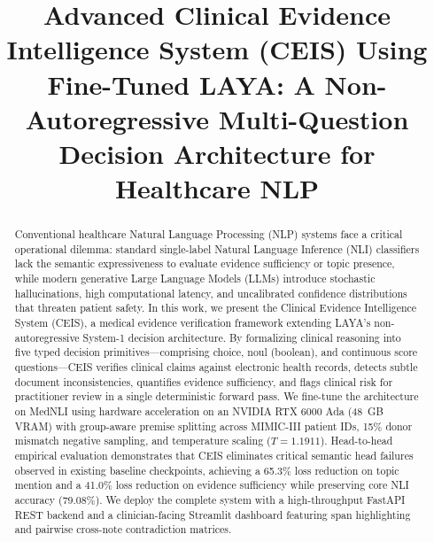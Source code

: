 \documentclass[10pt,conference]{IEEEtran}
\begin{document}
\title{Advanced Clinical Evidence Intelligence System (CEIS) Using Fine-Tuned LAYA: A Non-Autoregressive Multi-Question Decision Architecture for Healthcare NLP}

\author{
}

\maketitle

\begin{abstract}
Conventional healthcare Natural Language Processing (NLP) systems face a critical operational dilemma: standard single-label Natural Language Inference (NLI) classifiers lack the semantic expressiveness to evaluate evidence sufficiency or topic presence, while modern generative Large Language Models (LLMs) introduce stochastic hallucinations, high computational latency, and uncalibrated confidence distributions that threaten patient safety. In this work, we present the Clinical Evidence Intelligence System (CEIS), a medical evidence verification framework extending LAYA's non-autoregressive System-1 decision architecture. By formalizing clinical reasoning into five typed decision primitives---comprising choice, noul (boolean), and continuous score questions---CEIS verifies clinical claims against electronic health records, detects subtle document inconsistencies, quantifies evidence sufficiency, and flags clinical risk for practitioner review in a single deterministic forward pass. We fine-tune the architecture on MedNLI using hardware acceleration on an NVIDIA RTX 6000 Ada (48~GB VRAM) with group-aware premise splitting across MIMIC-III patient IDs, 15\% donor mismatch negative sampling, and temperature scaling ($T = 1.1911$). Head-to-head empirical evaluation demonstrates that CEIS eliminates critical semantic head failures observed in existing baseline checkpoints, achieving a 65.3\% loss reduction on topic mention and a 41.0\% loss reduction on evidence sufficiency while preserving core NLI accuracy (79.08\%). We deploy the complete system with a high-throughput FastAPI REST backend and a clinician-facing Streamlit dashboard featuring span highlighting and pairwise cross-note contradiction matrices.
\end{abstract}
\end{document}
